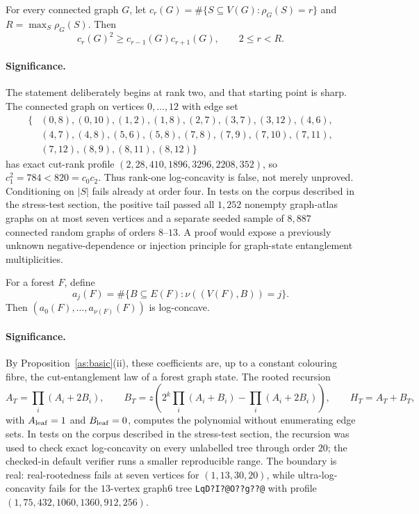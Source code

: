 \begin{conjecture}\label{as5}
For every connected graph $G$, let
$c_r(G)=\#\{S\subseteq V(G):\rho_G(S)=r\}$ and
$R=\max_S\rho_G(S)$.  Then
\[
 c_r(G)^2\ge c_{r-1}(G)c_{r+1}(G),\qquad 2\le r<R.
\]
\end{conjecture}

\paragraph{Significance.}
The statement deliberately begins at rank two, and that starting point is
sharp.  The connected graph on vertices $0,\ldots,12$ with edge set
\[
\begin{split}
\{&(0,8),(0,10),(1,2),(1,8),(2,7),(3,7),(3,12),(4,6),\\
  &(4,7),(4,8),(5,6),(5,8),(7,8),(7,9),(7,10),(7,11),\\
  &(7,12),(8,9),(8,11),(8,12)\}
\end{split}
\]
has exact cut-rank profile
$(2,28,410,1896,3296,2208,352)$, so
$c_1^2=784<820=c_0c_2$.  Thus rank-one log-concavity is false, not merely
unproved.  Conditioning on $|S|$ fails already at order four.  In tests on the corpus described in the stress-test section, the positive
tail passed all $1{,}252$ nonempty graph-atlas graphs on at most seven
vertices and a separate seeded sample of $8{,}887$ connected random graphs
of orders $8$--$13$.  A proof would expose a
previously unknown negative-dependence or injection principle for graph-state
entanglement multiplicities.

\begin{conjecture}\label{as6}
For a forest $F$, define
\[
 a_j(F)=\#\{B\subseteq E(F):\nu((V(F),B))=j\}.
\]
Then $(a_0(F),\ldots,a_{\nu(F)}(F))$ is log-concave.
\end{conjecture}

\paragraph{Significance.}
By Proposition~\ref{as:basic}(ii), these coefficients are, up to a constant
colouring fibre, the cut-entanglement law of a forest graph state.  The rooted
recursion
\[
 A_T=\prod_i(A_i+2B_i),\qquad
 B_T=z\!\left(2^k\prod_i(A_i+B_i)-\prod_i(A_i+2B_i)\right),\qquad
 H_T=A_T+B_T,
\]
with $A_{\rm leaf}=1$ and $B_{\rm leaf}=0$, computes the polynomial without
enumerating edge sets.  In tests on the corpus described in the stress-test section, the recursion
was used to check exact log-concavity on every unlabelled tree through order
$20$; the checked-in default verifier runs a smaller reproducible range.  The
boundary is real: real-rootedness
fails at seven vertices for $(1,13,30,20)$, while ultra-log-concavity fails for
the $13$-vertex graph6 tree \texttt{LqD?I?@O??g??@} with profile
$(1,75,432,1060,1360,912,256)$.

